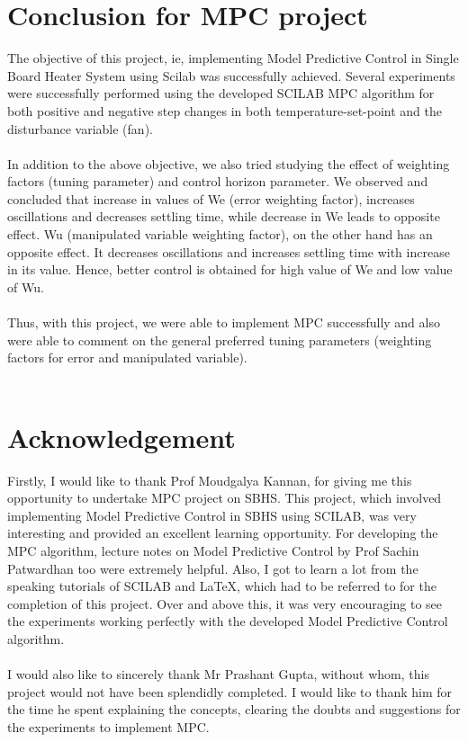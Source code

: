\section{Conclusion for MPC project}
The objective of this project, ie, implementing Model Predictive Control in Single Board Heater System using Scilab was successfully achieved. Several experiments were successfully performed using the developed SCILAB MPC algorithm for both positive and negative step changes in both temperature-set-point and the disturbance variable (fan). 
\\ \\ 
In addition to the above objective, we also tried studying the effect of weighting factors (tuning parameter) and control horizon parameter. We observed and concluded that increase in values of We (error weighting factor), increases oscillations and decreases settling time, while decrease in We leads to opposite effect. Wu (manipulated variable weighting factor), on the other hand has an opposite effect. It decreases oscillations and increases settling time with increase in its value. Hence, better control is obtained for high value of We and low value of Wu.
\\ \\
Thus, with this project, we were able to implement MPC successfully and also were able to comment on the general preferred tuning parameters (weighting factors for error and manipulated variable).
\\ \\

\section{Acknowledgement }
Firstly, I would like to thank Prof Moudgalya Kannan, for giving me this opportunity to undertake MPC project on SBHS. This project, which involved implementing Model Predictive Control in SBHS using SCILAB, was very interesting and provided an excellent learning opportunity. For developing the MPC algorithm, lecture notes on Model Predictive Control by Prof Sachin Patwardhan too were extremely helpful. Also, I got to learn a lot from the speaking tutorials of SCILAB and LaTeX, which had to be referred to for the completion of this project. Over and above this, it was very encouraging to see the experiments working perfectly with the developed Model Predictive Control algorithm.
\\ \\
I would also like to sincerely thank Mr Prashant Gupta, without whom, this project would not have been splendidly completed. I would like to thank him for the time he spent explaining the concepts, clearing the doubts and suggestions for the experiments to implement MPC.
\\ \\

